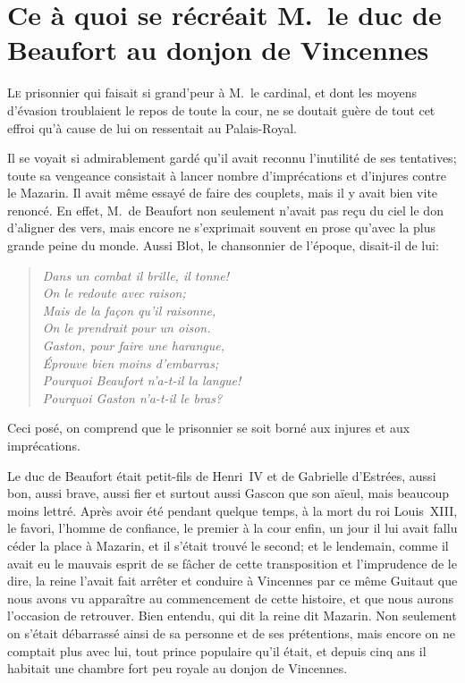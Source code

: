 \chapter{Ce à quoi se récréait M.~le duc de Beaufort au donjon de Vincennes}
	
	\lettrine{L}{e} prisonnier qui faisait si grand'peur à M.~le cardinal, et dont les moyens d'évasion troublaient le repos de toute la cour, ne se doutait guère de tout cet effroi qu'à cause de lui on ressentait au Palais-Royal.

\zz
Il se voyait si admirablement gardé qu'il avait reconnu l'inutilité de ses tentatives; toute sa vengeance consistait à lancer nombre d'imprécations et d'injures contre le Mazarin. Il avait même essayé de faire des couplets, mais il y avait bien vite renoncé. En effet, M.~de Beaufort non seulement n'avait pas reçu du ciel le don d'aligner des vers, mais encore ne s'exprimait souvent en prose qu'avec la plus grande peine du monde. Aussi Blot, le chansonnier de l'époque, disait-il de lui:

\begin{verse}
	\begin{altverse}\itshape
Dans un combat il brille, il tonne!\\
On le redoute avec raison;\\
Mais de la façon qu'il raisonne,\\
On le prendrait pour un oison.\\
Gaston, pour faire une harangue,\\
Éprouve bien moins d'embarras;\\
Pourquoi Beaufort n'a-t-il la langue!\\
Pourquoi Gaston n'a-t-il le bras?\\
\end{altverse}
\end{verse}

Ceci posé, on comprend que le prisonnier se soit borné aux injures et aux imprécations.

Le duc de Beaufort était petit-fils de Henri~IV et de Gabrielle d'Estrées, aussi bon, aussi brave, aussi fier et surtout aussi Gascon que son aïeul, mais beaucoup moins lettré. Après avoir été pendant quelque temps, à la mort du roi Louis~XIII, le favori, l'homme de confiance, le premier à la cour enfin, un jour il lui avait fallu céder la place à Mazarin, et il s'était trouvé le second; et le lendemain, comme il avait eu le mauvais esprit de se fâcher de cette transposition et l'imprudence de le dire, la reine l'avait fait arrêter et conduire à Vincennes par ce même Guitaut que nous avons vu apparaître au commencement de cette histoire, et que nous aurons l'occasion de retrouver. Bien entendu, qui dit la reine dit Mazarin. Non seulement on s'était débarrassé ainsi de sa personne et de ses prétentions, mais encore on ne comptait plus avec lui, tout prince populaire qu'il était, et depuis cinq ans il habitait une chambre fort peu royale au donjon de Vincennes.

